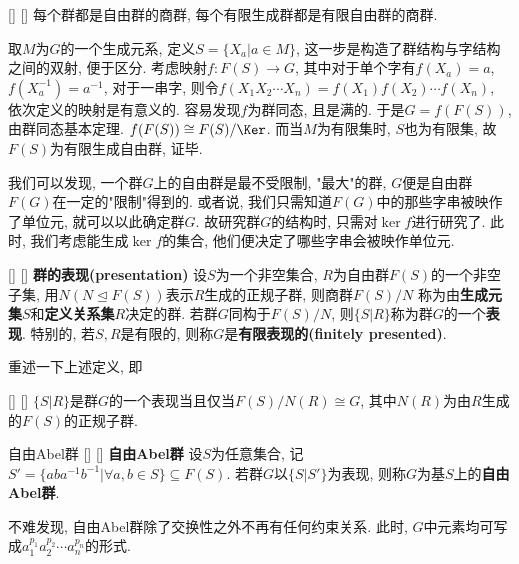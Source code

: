 \documentclass[UTF8]{ctexart}
\begin{document}
        \begin{thm}
            []
            {}
            []
            []
            每个群都是自由群的商群, 每个有限生成群都是有限自由群的商群.
       \end{thm}

        \begin{prf}
            取$M$为$G$的一个生成元系, 定义$S=\{X_a|a\in M\}$, 这一步是构造了群结构与字结构之间的双射, 
            便于区分. 考虑映射$f:F(S)\to G$, 其中对于单个字有$f(X_a)=a$, $f(X_a^{-1})=a^{-1}$, 
            对于一串字, 则令$f(X_1X_2\cdots X_n)=f(X_1)f(X_2)\cdots f(X_n)$, 依次定义的映射是有意义的.
            容易发现$f$为群同态, 且是满的. 于是$G=f(F(S))$, 由群同态基本定理.
            $f(F(S))\cong F(S)/\Ker$. 而当$M$为有限集时, $S$也为有限集, 
            故$F(S)$为有限生成自由群, 证毕.
        \end{prf}

        我们可以发现, 一个群$G$上的自由群是最不受限制, "最大"的群, $G$便是自由群$F(G)$在一定的"限制"得到的. 
        或者说, 我们只需知道$F(G)$中的那些字串被映作了单位元, 就可以以此确定群$G$. 故研究群$G$的结构时, 只需对$\ker f$进行研究了. 
        此时, 我们考虑能生成$\ker f$的集合, 他们便决定了哪些字串会被映作单位元.
        
        \begin{dfn}
            []
            {}
            []
            []
        \textbf{群的表现(presentation)}
            设$S$为一个非空集合, $R$为自由群$F(S)$的一个非空子集, 用$N(N\trianglelefteq F(S))$表示$R$生成的正规子群, 则商群$F(S)/N$
            称为由\textbf{生成元集}$S$和\textbf{定义关系集}$R$决定的群. 若群$G$同构于$F(S)/N$, 则$\{S|R\}$称为群$G$的一个\textbf{表现}. 
            特别的, 若$S,R$是有限的, 则称$G$是\textbf{有限表现的(finitely presented)}.
       \end{dfn}
        重述一下上述定义, 即
        \begin{ppt}
            []
            {}
            []
            []
            $\{S|R\}$是群$G$的一个表现当且仅当$F(S)/N(R)\cong G$, 其中$N(R)$为由$R$生成的$F(S)$的正规子群.
       \end{ppt}

        \begin{dfn}
            []
            {自由Abel群}
            []
            []
        \textbf{自由Abel群}
            设$S$为任意集合, 记
            $S'=\{aba^{-1}b^{-1}|\forall a,b\in S\}\subseteq F(S)$. 
            若群$G$以$\{S|S'\}$为表现, 则称$G$为基$S$上的\textbf{自由Abel群}.
        \end{dfn}
        不难发现, 自由Abel群除了交换性之外不再有任何约束关系.
	此时, $G$中元素均可写成$a_1^{p_1}a_2^{p_2}\cdots a_n^{p_n}$的形式. 
    
\end{document}
